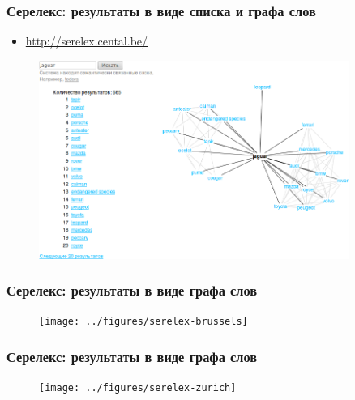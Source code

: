\begin{frame}
\frametitle{Серелекс: результаты в виде списка и графа слов}

\begin{itemize}
\item \url{http://serelex.cental.be/}
\end{itemize}


\begin{figure}  
    \centering
    \includegraphics[width=0.9\textwidth]{jaguar}
\end{figure}

\end{frame}








\begin{frame}
\frametitle{Серелекс: результаты в виде графа слов}

\begin{figure}
\centering
\texttt{[image: ../figures/serelex-brussels]}
\end{figure}

\end{frame}






\begin{frame}
\frametitle{Серелекс: результаты в виде графа слов}

\begin{figure}
\centering
\texttt{[image: ../figures/serelex-zurich]}       
\end{figure}

\end{frame}






